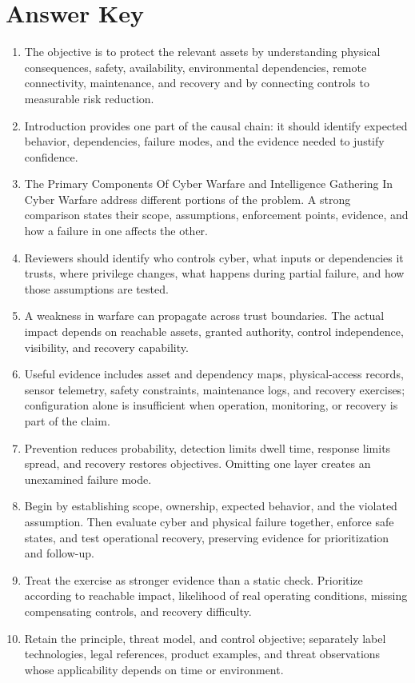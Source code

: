 \documentclass[11pt,letterpaper]{article}
\begin{document}
\section*{Answer Key}
\begin{enumerate}
\item The objective is to protect the relevant assets by understanding physical consequences, safety, availability, environmental dependencies, remote connectivity, maintenance, and recovery and by connecting controls to measurable risk reduction.
\item Introduction provides one part of the causal chain: it should identify expected behavior, dependencies, failure modes, and the evidence needed to justify confidence.
\item The Primary Components Of Cyber Warfare and Intelligence Gathering In Cyber Warfare address different portions of the problem. A strong comparison states their scope, assumptions, enforcement points, evidence, and how a failure in one affects the other.
\item Reviewers should identify who controls cyber, what inputs or dependencies it trusts, where privilege changes, what happens during partial failure, and how those assumptions are tested.
\item A weakness in warfare can propagate across trust boundaries. The actual impact depends on reachable assets, granted authority, control independence, visibility, and recovery capability.
\item Useful evidence includes asset and dependency maps, physical-access records, sensor telemetry, safety constraints, maintenance logs, and recovery exercises; configuration alone is insufficient when operation, monitoring, or recovery is part of the claim.
\item Prevention reduces probability, detection limits dwell time, response limits spread, and recovery restores objectives. Omitting one layer creates an unexamined failure mode.
\item Begin by establishing scope, ownership, expected behavior, and the violated assumption. Then evaluate cyber and physical failure together, enforce safe states, and test operational recovery, preserving evidence for prioritization and follow-up.
\item Treat the exercise as stronger evidence than a static check. Prioritize according to reachable impact, likelihood of real operating conditions, missing compensating controls, and recovery difficulty.
\item Retain the principle, threat model, and control objective; separately label technologies, legal references, product examples, and threat observations whose applicability depends on time or environment.
\end{enumerate}
\end{document}

